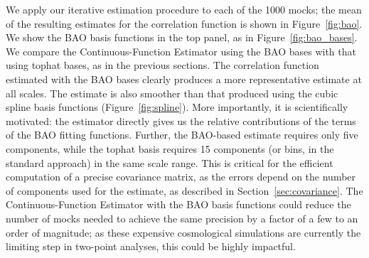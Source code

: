 \documentclass[modern]{aastex62}
\newcommand{\Est}{The Continuous-Function Estimator\xspace}
\newcommand{\est}{the Continuous-Function Estimator\xspace}
\begin{document}
We apply our iterative estimation procedure to each of the 1000 mocks; the mean of the resulting estimates for the correlation function is shown in Figure~\ref{fig:bao}.
We show the BAO basis functions in the top panel, as in Figure~\ref{fig:bao_bases}.
We compare \est using the BAO bases with that using tophat bases, as in the previous sections.
The correlation function estimated with the BAO bases clearly produces a more representative estimate at all scales.
The estimate is also smoother than that produced using the cubic spline basis functions (Figure~\ref{fig:spline}).
More importantly, it is scientifically motivated: the estimator directly gives us the relative contributions of the terms of the BAO fitting functions.
Further, the BAO-based estimate requires only five components, while the tophat basis requires 15 components (or bins, in the standard approach) in the same scale range.
This is critical for the efficient computation of a precise covariance matrix, as the errors depend on the number of components used for the estimate, as described in Section~\ref{sec:covariance}.
\Est with the BAO basis functions could reduce the number of mocks needed to achieve the same precision by a factor of a few to an order of magnitude; as these expensive cosmological simulations are currently the limiting step in two-point analyses, this could be highly impactful.
\end{document}
